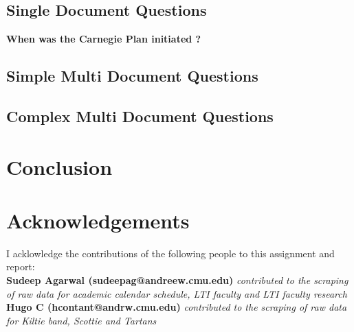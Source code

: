 \documentclass[11pt]{article}
\begin{document}
\subsection{Single Document Questions}
\textbf{When was the Carnegie Plan initiated ?}
\bfseries{}
\textbf{}
\bfseries{}
\textbf{}
\bfseries{}

\subsection{Simple Multi Document Questions}

\subsection {Complex Multi Document Questions}
\section{Conclusion}


\clearpage
\section*{Acknowledgements}
I acklowledge the contributions of the following people to this assignment and report:
\\
\textbf{Sudeep Agarwal (sudeepag@andreew.cmu.edu)} \textit{contributed to the scraping of raw data for academic calendar schedule, LTI faculty and LTI faculty research}
\\
\textbf{Hugo C (hcontant@andrw.cmu.edu)} \textit{contributed to the scraping of raw data for Kiltie band, Scottie and Tartans}


\end{document}
